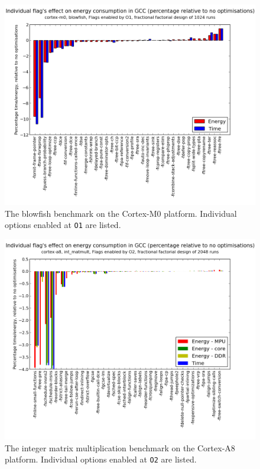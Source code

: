 \documentclass[twocolumn]{article}
\begin{document}
\begin{figure}[t]
	\includegraphics[width=\linewidth]{cortex-m0/O1_main_effects_blowfish.png}
	\caption{The blowfish benchmark on the Cortex-M0 platform. Individual options enabled at \texttt{O1} are listed.}
	\label{Fig:BlowfishMainEffects}
\end{figure}

\begin{figure}[t]
	\includegraphics[width=\linewidth]{cortex-a8/O2_main_effects_int_matmult.png}
	\caption{The integer matrix multiplication benchmark on the Cortex-A8 platform. Individual options enabled at \texttt{O2} are listed.}
	\label{Fig:IntMatmultO2MainEffects}
\end{figure}
\end{document}
